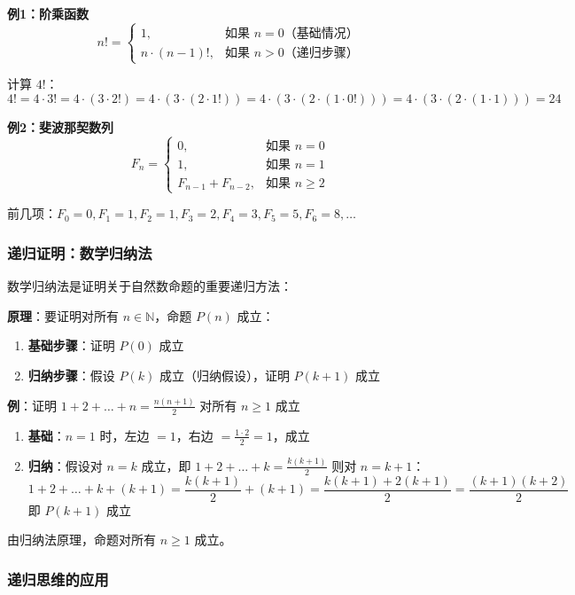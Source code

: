 \documentclass[12pt,a4paper,UTF8]{ctexart}
\begin{document}
\textbf{例1：阶乘函数}
$$n! = \begin{cases}
1, & \text{如果 } n = 0 \text{（基础情况）} \\
n \cdot (n-1)!, & \text{如果 } n > 0 \text{（递归步骤）}
\end{cases}$$

计算 $4!$：
$$4! = 4 \cdot 3! = 4 \cdot (3 \cdot 2!) = 4 \cdot (3 \cdot (2 \cdot 1!)) = 4 \cdot (3 \cdot (2 \cdot (1 \cdot 0!))) = 4 \cdot (3 \cdot (2 \cdot (1 \cdot 1))) = 24$$

\textbf{例2：斐波那契数列}
$$F_n = \begin{cases}
0, & \text{如果 } n = 0 \\
1, & \text{如果 } n = 1 \\
F_{n-1} + F_{n-2}, & \text{如果 } n \ge 2
\end{cases}$$

前几项：$F_0=0, F_1=1, F_2=1, F_3=2, F_4=3, F_5=5, F_6=8, \dots$

\subsubsection{递归证明：数学归纳法}

数学归纳法是证明关于自然数命题的重要递归方法：

\textbf{原理}：要证明对所有 $n \in \mathbb{N}$，命题 $P(n)$ 成立：
\begin{enumerate}
    \item \textbf{基础步骤}：证明 $P(0)$ 成立
    \item \textbf{归纳步骤}：假设 $P(k)$ 成立（归纳假设），证明 $P(k+1)$ 成立
\end{enumerate}

\textbf{例}：证明 $1+2+\dots+n = \frac{n(n+1)}{2}$ 对所有 $n \ge 1$ 成立

\begin{enumerate}
    \item \textbf{基础}：$n=1$ 时，左边 $=1$，右边 $=\frac{1\cdot 2}{2}=1$，成立
    \item \textbf{归纳}：假设对 $n=k$ 成立，即 $1+2+\dots+k = \frac{k(k+1)}{2}$
   则对 $n=k+1$：
   $$1+2+\dots+k+(k+1) = \frac{k(k+1)}{2} + (k+1) = \frac{k(k+1)+2(k+1)}{2} = \frac{(k+1)(k+2)}{2}$$
   即 $P(k+1)$ 成立
\end{enumerate}

由归纳法原理，命题对所有 $n \ge 1$ 成立。

\subsubsection{递归思维的应用}
\end{document}
